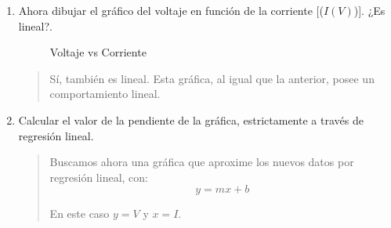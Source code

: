 \documentclass{article}
\begin{document}
\begin{enumerate}[label=\alph*.-]
        \item Ahora dibujar el gráfico del voltaje en función de la corriente [($I(V)$)]. ¿Es lineal?.
        
        \begin{figure}[ht]
            \begin{center}
            \end{center}
            \caption{Voltaje vs Corriente}\label{fig:R}
        \end{figure}

        \begin{quote}
            Sí, también es lineal. Esta gráfica, al igual que la anterior, posee un comportamiento lineal.
        \end{quote}
        
        \item Calcular el valor de la pendiente de la gráfica, estrictamente a través de regresión lineal.
        
        \begin{quote}
            Buscamos ahora una gráfica que aproxime los nuevos datos por regresión lineal, con:
            \[
                y = mx + b
            \]

            En este caso $y = V$ y $x = I$.


\end{quote}
\end{enumerate}
\end{document}
